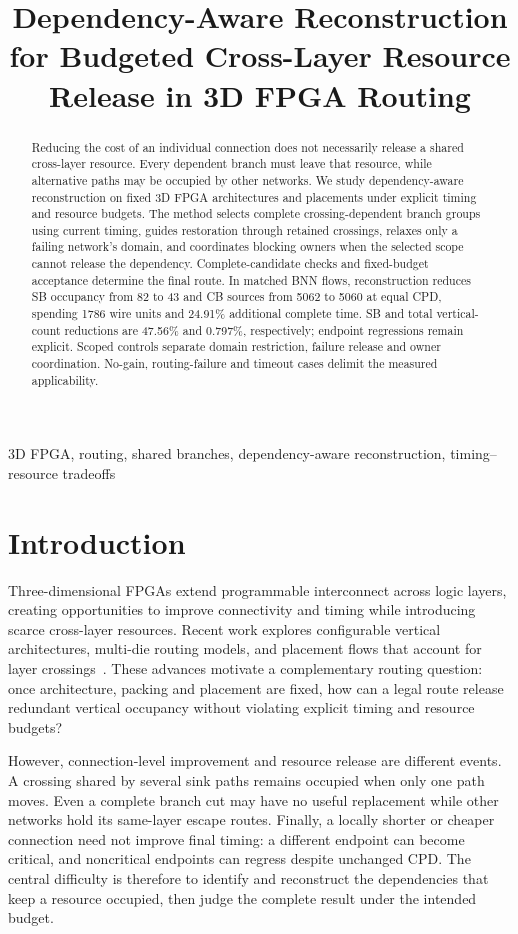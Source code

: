\documentclass[conference,10pt]{IEEEtran}
\title{Dependency-Aware Reconstruction for Budgeted Cross-Layer Resource Release in 3D FPGA Routing}
\author{\IEEEauthorblockN{Anonymous submission}}
\begin{document}
\maketitle
\begin{abstract}
Reducing the cost of an individual connection does not necessarily release a shared cross-layer resource. Every dependent branch must leave that resource, while alternative paths may be occupied by other networks. We study dependency-aware reconstruction on fixed 3D FPGA architectures and placements under explicit timing and resource budgets. The method selects complete crossing-dependent branch groups using current timing, guides restoration through retained crossings, relaxes only a failing network's domain, and coordinates blocking owners when the selected scope cannot release the dependency. Complete-candidate checks and fixed-budget acceptance determine the final route. In matched BNN flows, reconstruction reduces SB occupancy from 82 to 43 and CB sources from 5062 to 5060 at equal CPD, spending 1786 wire units and 24.91\% additional complete time. SB and total vertical-count reductions are 47.56\% and 0.797\%, respectively; endpoint regressions remain explicit. Scoped controls separate domain restriction, failure release and owner coordination. No-gain, routing-failure and timeout cases delimit the measured applicability.
\end{abstract}
\begin{IEEEkeywords}
3D FPGA, routing, shared branches, dependency-aware reconstruction, timing--resource tradeoffs
\end{IEEEkeywords}

\section{Introduction}
Three-dimensional FPGAs extend programmable interconnect across logic layers, creating opportunities to improve connectivity and timing while introducing scarce cross-layer resources. Recent work explores configurable vertical architectures, multi-die routing models, and placement flows that account for layer crossings~\cite{lazagna,multidie,flatland}. These advances motivate a complementary routing question: once architecture, packing and placement are fixed, how can a legal route release redundant vertical occupancy without violating explicit timing and resource budgets?

However, connection-level improvement and resource release are different events. A crossing shared by several sink paths remains occupied when only one path moves. Even a complete branch cut may have no useful replacement while other networks hold its same-layer escape routes. Finally, a locally shorter or cheaper connection need not improve final timing: a different endpoint can become critical, and noncritical endpoints can regress despite unchanged CPD. The central difficulty is therefore to identify and reconstruct the dependencies that keep a resource occupied, then judge the complete result under the intended budget.
\end{document}
